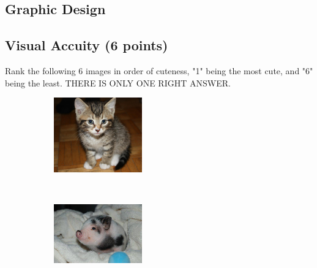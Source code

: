 \documentclass[11pt]{exam}
\begin{document}
\begin{questions}
\newpage
\section{Graphic Design}
\subsection{Visual Accuity (6 points)}
\setcounter{question}{0}

\question Rank the following 6 images in order of cuteness, "1" being the most cute, and "6" being the least. THERE IS ONLY ONE RIGHT ANSWER.

\begin{figure}[h]
    \centering
    \begin{subfigure}[b]{0.3\textwidth}
        \includegraphics[width=\textwidth]{cute1}
        \caption{\underline{\hspace{2cm}}}
        \label{fig:anzu}
    \end{subfigure}
    ~ %
    \begin{subfigure}[b]{0.3\textwidth}
        \includegraphics[width=\textwidth]{cute2}

\end{subfigure}
\end{figure}
\end{questions}
\end{document}
